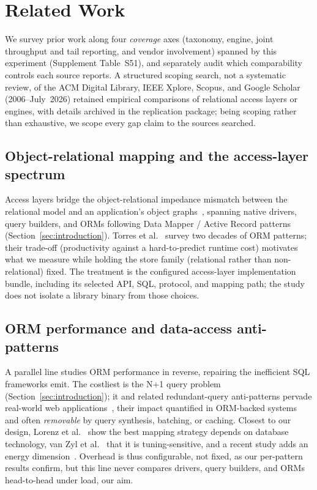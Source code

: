 \section{Related Work}
\label{sec:related}

We survey prior work along four \emph{coverage} axes (taxonomy, engine, joint throughput and tail
reporting, and vendor involvement) spanned by this experiment (Supplement Table~S51), and separately
audit which comparability controls each source reports. A structured scoping search, not a systematic
review, of the ACM Digital Library, IEEE Xplore, Scopus, and Google Scholar (2006--July~2026)
retained empirical comparisons of relational access layers or engines, with details archived in the
replication package; being scoping rather than exhaustive, we scope every gap claim to the sources
searched.

\subsection{Object-relational mapping and the access-layer spectrum}
Access layers bridge the object-relational impedance mismatch between the relational model and an
application's object graphs~\cite{ireland2009impedance}, spanning native drivers, query builders, and
ORMs following Data Mapper / Active Record patterns~\cite{fowler2002patterns}
(Section~\ref{sec:introduction}). Torres et al.~\cite{torres2017orm} survey two decades of ORM
patterns; their trade-off (productivity against a hard-to-predict runtime cost) motivates what
we measure while holding the store family (relational rather than non-relational) fixed. The treatment is the configured
access-layer implementation bundle, including its selected API, SQL, protocol, and mapping path;
the study does not isolate a library binary from those choices.

\subsection{ORM performance and data-access anti-patterns}
A parallel line studies ORM performance in reverse, repairing the inefficient SQL frameworks emit.
The costliest is the N+1 query problem (Section~\ref{sec:introduction}); it and related
redundant-query anti-patterns pervade real-world web
applications~\cite{yang2018dbapps}, their impact quantified in ORM-backed
systems~\cite{chen2016redundant,chen2014orm} and often \emph{removable} by query synthesis,
batching, or caching. Closest to our
design, Lorenz et al.~\cite{lorenz2017orm} show the best mapping strategy depends on database
technology, van Zyl et al.~\cite{vanzyl2009optimisations} that it is tuning-sensitive, and a recent
study adds an energy dimension~\cite{bonvoisin2024orm}. Overhead is thus configurable, not fixed, 
as our per-pattern results confirm, but this line never compares drivers, query builders, and ORMs
head-to-head under load, our aim.

